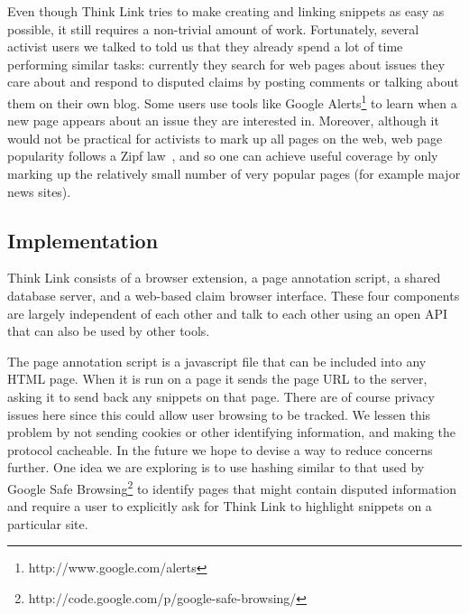 \documentclass{chi2009}
\newcommand{\todo}[1]{}
\begin{document}
\todo{Talk about previewing a topic by showing wikipedia page}

Even though Think Link tries to make creating and linking snippets as easy as possible, it still requires a non-trivial amount of work. Fortunately, several activist users we talked to told us that they already spend a lot of time performing similar tasks: currently they search for web pages about issues they care about and respond to disputed claims by posting comments or talking about them on their own blog. Some users use tools like Google Alerts\footnote{http://www.google.com/alerts} to learn when a new page appears about an issue they are interested in. Moreover, although it would not be practical for activists to mark up all pages on the web, web page popularity follows a Zipf law~\cite{Krashakov2006}, and so one can achieve useful coverage by only marking up the relatively small number of very popular pages (for example major news sites).

\todo{Mention about topic previewing}

\todo{Allow two claims to be marked as being identical.}

\todo{BUG: don't have 'add' button for snippets}


\subsection{Implementation}

Think Link consists of a browser extension, a page annotation script, a shared database server, and a web-based claim browser interface. These four components are largely independent of each other and talk to each other using an open API that can also be used by other tools. 

The page annotation script is a javascript file that can be included into any HTML page. When it is run on a page it sends the page URL to the server, asking it to send back any snippets on that page. There are of course privacy issues here since this could allow user browsing to be tracked. We lessen this problem by not sending cookies or other identifying information, and making the protocol cacheable. 
In the future we hope to devise a way to reduce concerns further. 
One idea we are exploring is to use hashing similar to that used by Google Safe Browsing\footnote{http://code.google.com/p/google-safe-browsing/} to identify pages that might contain disputed information and require a user to explicitly ask for Think Link to highlight snippets on a particular site.
\end{document}
